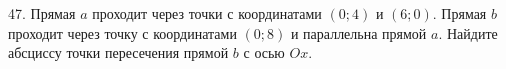 47. Прямая $a$ проходит через точки с координатами $(0;4)$ и $(6;0).$ Прямая $b$ проходит через точку с координатами $(0;8)$ и параллельна прямой $a.$ Найдите абсциссу точки пересечения прямой $b$ с осью $Ox.$\\
